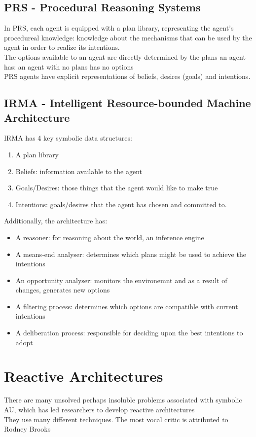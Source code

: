\subsection{PRS - Procedural Reasoning Systems}
In PRS, each agent is equipped with a plan library, representing the agent's procedureal knowledge: knowledge about the mechanisms that can be used by the agent in order to realize its intentions.\\
The options available to an agent are directly determined by the plans an agent has: an agent with no plans has no options\\
PRS agents have explicit representations of beliefs, desires (goals) and intentions.
\subsection{IRMA - Intelligent Resource-bounded Machine Architecture}
IRMA has 4 key symbolic data structures:
\begin{enumerate}
\item A plan library
\item Beliefs: information available to the agent
\item Goals/Desires: those things that the agent would like to make true
\item Intentions: goals/desires that the agent has chosen and committed to.
\end{enumerate}

Additionally, the architecture has:
\begin{itemize}
\item A reasoner: for reasoning about the world, an inference engine
\item A means-end analyser: determines which plans might be used to achieve the intentions
\item An opportunity analyser: monitors the environemnt and as a result of changes, generates new options
\item A filtering process: determines which options are compatible with current intentions
\item A deliberation process: responsible for deciding upon the best intentions to adopt
\end{itemize}
\section{Reactive Architectures}
There are many unsolved perhaps insoluble problems associated with symbolic AU, which has led researchers to develop reactive architectures\\
They use many different techniques. The most vocal critic is attributed to Rodney Brooks
